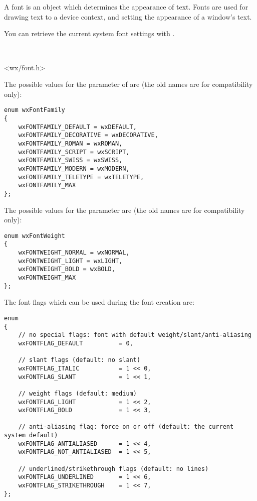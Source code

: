 \section{}\label{wxfont}

A font is an object which determines the appearance of text. Fonts are
used for drawing text to a device context, and setting the appearance of
a window's text.

You can retrieve the current system font settings with .



\\


<wx/font.h>


The possible values for the  parameter of  are (the old names are for compatibility only):

\begin{verbatim}
enum wxFontFamily
{
    wxFONTFAMILY_DEFAULT = wxDEFAULT,
    wxFONTFAMILY_DECORATIVE = wxDECORATIVE,
    wxFONTFAMILY_ROMAN = wxROMAN,
    wxFONTFAMILY_SCRIPT = wxSCRIPT,
    wxFONTFAMILY_SWISS = wxSWISS,
    wxFONTFAMILY_MODERN = wxMODERN,
    wxFONTFAMILY_TELETYPE = wxTELETYPE,
    wxFONTFAMILY_MAX
};
\end{verbatim}

The possible values for the  parameter are (the old names
are for compatibility only):

\begin{verbatim}
enum wxFontWeight
{
    wxFONTWEIGHT_NORMAL = wxNORMAL,
    wxFONTWEIGHT_LIGHT = wxLIGHT,
    wxFONTWEIGHT_BOLD = wxBOLD,
    wxFONTWEIGHT_MAX
};
\end{verbatim}

The font flags which can be used during the font creation are:

\begin{verbatim}
enum
{
    // no special flags: font with default weight/slant/anti-aliasing
    wxFONTFLAG_DEFAULT          = 0,

    // slant flags (default: no slant)
    wxFONTFLAG_ITALIC           = 1 << 0,
    wxFONTFLAG_SLANT            = 1 << 1,

    // weight flags (default: medium)
    wxFONTFLAG_LIGHT            = 1 << 2,
    wxFONTFLAG_BOLD             = 1 << 3,

    // anti-aliasing flag: force on or off (default: the current system default)
    wxFONTFLAG_ANTIALIASED      = 1 << 4,
    wxFONTFLAG_NOT_ANTIALIASED  = 1 << 5,

    // underlined/strikethrough flags (default: no lines)
    wxFONTFLAG_UNDERLINED       = 1 << 6,
    wxFONTFLAG_STRIKETHROUGH    = 1 << 7,
};
\end{verbatim}

